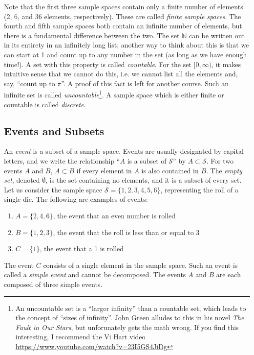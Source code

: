 \documentclass[12pt]{article}
\theoremstyle{definition}
\theoremstyle{remark}
\def\N{{\mathbb N}}
\def\cals{{\mathcal S}}
\begin{document}
Note that the first three sample spaces contain only a finite number of elements (2, 6, and 36 elements, respectively). These are called \emph{finite sample spaces}. The fourth and fifth sample spaces both contain an infinite number of elements, but there is a fundamental difference between the two. The set $\N$ can be written out in its entirety in an infinitely long list; another way to think about this is that we can start at 1 and count up to any number in the set (as long as we have enough time!). A set with this property is called \emph{countable}. For the set $[0, \infty)$, it makes intuitive sense that we cannot do this, i.e. we cannot list all the elements and, say, ``count up to $\pi$''. A proof of this fact is left for another course. Such an infinite set is called \emph{uncountable}\footnote{An uncountable set is a ``larger infinity'' than a countable set, which leads to the concept of ``sizes of infinity''. John Green alludes to this in his novel \emph{The Fault in Our Stars}, but unforunately gets the math wrong. If you find this interesting, I recommend the Vi Hart video \url{https://www.youtube.com/watch?v=23I5GS4JiDg}}. A sample space which is either finite or countable is called \emph{discrete}.\\

\subsection{Events and Subsets}
An \emph{event} is a subset of a sample space. Events are usually designated by capital letters, and we write the relationship ``$A$ is a subset of $\cals$'' by $A \subset \cals$. For two events $A$ and $B$, $A \subset B$ if every element in $A$ is also contained in $B$. The \emph{empty set}, denoted $\emptyset$, is the set containing no elements, and it is a subset of every set.
\\

Let us consider the sample space $\cals = \{1, 2, 3, 4, 5, 6\}$, representing the roll of a single die. The following are examples of events:
\begin{enumerate}
\item $A = \{2, 4, 6\}$, the event that an even number is rolled
\item $B = \{1, 2, 3\}$, the event that the roll is less than or equal to 3
\item $C = \{1\}$, the event that a 1 is rolled
\end{enumerate}
The event $C$ consists of a single element in the sample space. Such an event is called a \emph{simple event} and cannot be decomposed. The events $A$ and $B$ are each composed of three simple events.\\
\end{document}

